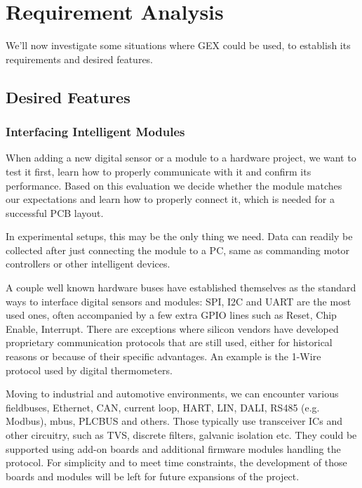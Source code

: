 \chapter{Requirement Analysis}

We'll now investigate some situations where GEX could be used, to establish its requirements and desired features.

\section{Desired Features}

\subsection{Interfacing Intelligent Modules}\label{sec:uses-digital-ifaces}

When adding a new digital sensor or a module to a hardware project, we want to test it first, learn how to properly communicate with it and confirm its performance. Based on this evaluation we decide whether the module matches our expectations and learn how to properly connect it, which is needed for a successful PCB layout.

In experimental setups, this may be the only thing we need. Data can readily be collected after just connecting the module to a PC, same as commanding motor controllers or other intelligent devices.

A couple well known hardware buses have established themselves as the standard ways to interface digital sensors and modules: SPI, I2C and UART are the most used ones, often accompanied by a few extra GPIO lines such as Reset, Chip Enable, Interrupt. There are exceptions where silicon vendors have developed proprietary communication protocols that are still used, either for historical reasons or because of their specific advantages. An example is the 1-Wire protocol used by digital thermometers.

Moving to industrial and automotive environments, we can encounter various fieldbuses, Ethernet, CAN, current loop, HART, LIN, DALI, RS485 (e.g. Modbus), mbus, PLCBUS and others. Those typically use transceiver ICs and other circuitry, such as TVS, discrete filters, galvanic isolation etc. They could be supported using add-on boards and additional firmware modules handling the protocol. For simplicity and to meet time constraints, the development of those boards and modules will be left for future expansions of the project.

